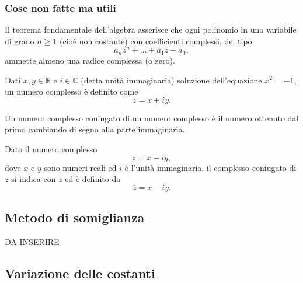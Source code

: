 \subsubsection{Cose non fatte ma utili}
\begin{theorem}
    Il teorema fondamentale dell'algebra asserisce che ogni polinomio in una variabile di grado $n\geq 1$ (cioè non costante) con coefficienti complessi, del tipo
    \begin{equation*}
        a_{n}z^{n}+\ldots +a_{1}z+a_{0},
    \end{equation*}
    ammette almeno una radice complessa (o zero). 
\end{theorem}
\begin{definition}
    Dati $x,y\in\mathbb R$ e $i\in\mathbb C$ (detta unità immaginaria) soluzione dell'equazione $x^2=-1$, un numero complesso è definito come
    \begin{equation*}
        z=x+iy.
    \end{equation*}
\end{definition}
Un numero complesso coniugato di un numero complesso è il numero ottenuto dal primo cambiando di segno alla parte immaginaria.
\begin{definition}\label{def:complesso_coniugato}
    Dato il numero complesso
    \begin{equation*}
        z = x + i y,
    \end{equation*}
    dove $x$ e $y$ sono numeri reali ed $i$ è l'unità immaginaria, il complesso coniugato di $z$ si indica con $\bar {z}$ ed è definito da
    \begin{equation*}
        \bar {z}=x-iy.
    \end{equation*}
\end{definition}

\subsection{Metodo di somiglianza}\label{ssec:metodo_somiglianza}
DA INSERIRE

\subsection{Variazione delle costanti}\label{ssec:variazione_costanti}
